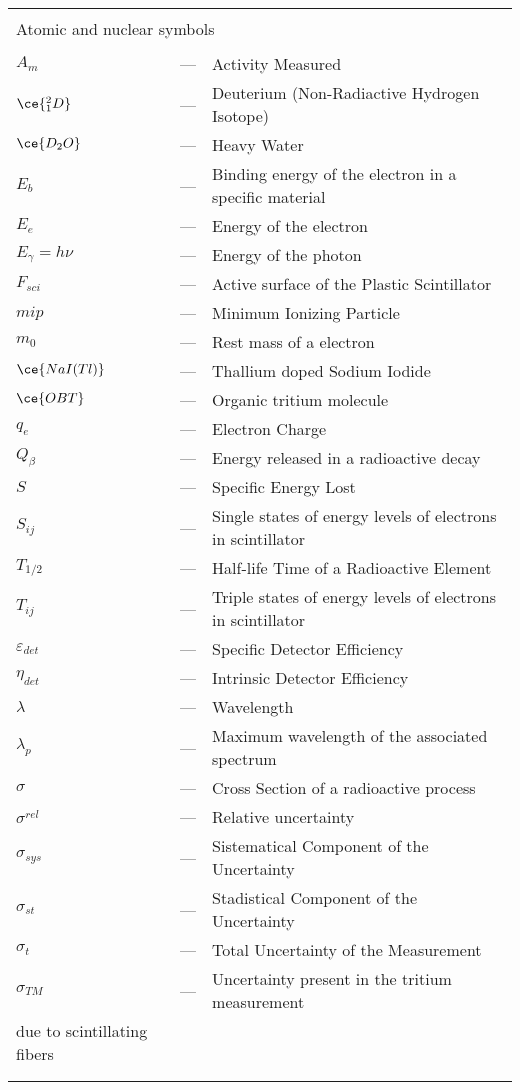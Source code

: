 \begin{longtable}{p{25mm} c p{120mm} }
\\
\\
\multicolumn{3}{l}{Atomic and nuclear symbols}\\
\\
$A_{m}$ & --- & Activity Measured\\
$\ce{^{2}_{1}D}$ & --- & Deuterium (Non-Radiactive Hydrogen Isotope)\\
$\ce{D_{2}O}$ & --- & Heavy Water\\
$E_b$ & --- & Binding energy of the electron in a specific material\\
$E_e$ & --- & Energy of the electron\\
$E_\gamma = h\nu$ & --- & Energy of the photon\\
$F_{sci}$ & --- & Active surface of the Plastic Scintillator\\
$mip$ & --- & Minimum Ionizing Particle\\
$m_0$ & --- & Rest mass of a electron\\
$\ce{NaI(Tl)}$ & --- & Thallium doped Sodium Iodide\\
$\ce{OBT}$ & --- & Organic tritium molecule\\
$q_{e}$ & --- & Electron Charge\\
$Q_\beta$ & --- & Energy released in a radioactive decay\\
$S$ & --- & Specific Energy Lost\\
$S_{ij}$ & --- & Single states of energy levels of electrons in scintillator\\
$T_{1/2}$ & --- & Half-life Time of a Radioactive Element\\
$T_{ij}$ & --- & Triple states of energy levels of electrons in scintillator\\
$\varepsilon_{det}$ & --- & Specific Detector Efficiency\\
$\eta_{det}$ & --- & Intrinsic Detector Efficiency\\
$\lambda$ & --- & Wavelength\\
$\lambda_p$ & --- & Maximum wavelength of the
\newline associated spectrum\\
$\sigma$ & --- & Cross Section of a radioactive process\\
$\sigma^{rel}$ & --- & Relative uncertainty\\
$\sigma_{sys}$ & --- & Sistematical Component of the Uncertainty\\
$\sigma_{st}$ & --- & Stadistical Component of the Uncertainty\\
$\sigma_{t}$ & --- & Total Uncertainty of the Measurement\\
$\sigma_{TM}$ & --- & Uncertainty present in the tritium measurement\\due to scintillating fibers\\
\\
\\


\end{longtable}
